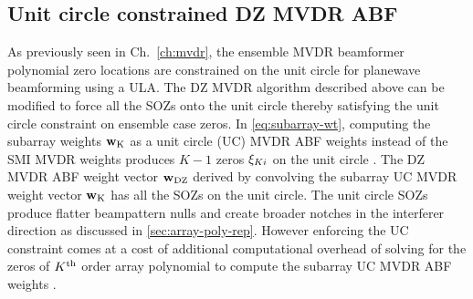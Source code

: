 \subsection{Unit circle constrained DZ MVDR ABF}
\label{sec:unit-circle-constr}
As previously seen in Ch.~\ref{ch:mvdr}, the ensemble MVDR beamformer
polynomial zero locations are constrained on the unit circle for
planewave beamforming using a ULA. The DZ MVDR algorithm described
above can be modified to force all the SOZs onto the unit circle
thereby satisfying the unit circle constraint on ensemble case
zeros. In \eqref{eq:subarray-wt}, computing the subarray weights
${\bf w}_{\rm K}$ as a unit circle (UC) MVDR ABF weights instead of the SMI MVDR
weights produces $K - 1$ zeros $\xi_{Ki}$ on the unit circle
\cite{tuladhar2015ucmvdr}. The DZ MVDR ABF weight vector ${\bf w}_{\rm DZ}$
derived by convolving the subarray UC MVDR weight vector ${\bf w}_{\rm K}$ has
all the SOZs on the unit circle. The unit circle SOZs produce flatter
beampattern nulls and create broader notches in the interferer
direction as discussed in \ref{sec:array-poly-rep}. However enforcing
the UC constraint comes at a cost of additional computational overhead
of solving for the zeros of $K^{\rm th}$ order array polynomial to compute
the subarray UC MVDR ABF weights \cite{tuladhar2015ucmvdr}.



